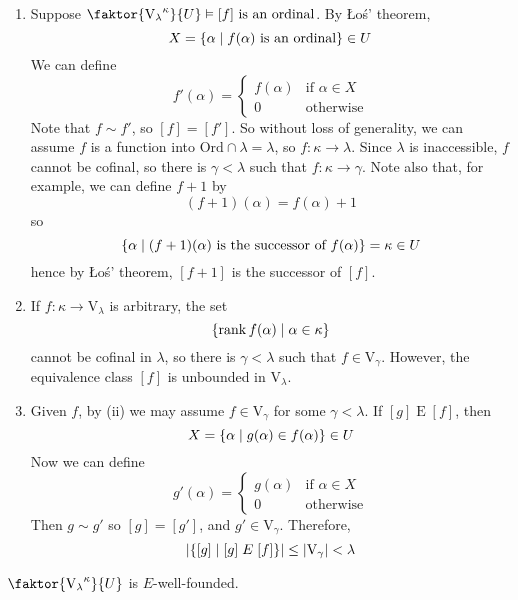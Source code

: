 \begin{remark}
    \begin{enumerate}
        \item Suppose \( \faktor{{\mathrm{V}_\lambda}^\kappa}{U} \vDash [f] \text{ is an ordinal} \).
        By \L{}o\'s' theorem,
        \[ X = \qty{\alpha \mid f(\alpha) \text{ is an ordinal}} \in U \]
        We can define
        \[ f'(\alpha) = \begin{cases}
            f(\alpha) & \text{if } \alpha \in X \\
            0 & \text{otherwise}
        \end{cases} \]
        Note that \( f \sim f' \), so \( [f] = [f'] \).
        So without loss of generality, we can assume \( f \) is a function into \( \mathrm{Ord} \cap \lambda = \lambda \), so \( f : \kappa \to \lambda \).
        Since \( \lambda \) is inaccessible, \( f \) cannot be cofinal, so there is \( \gamma < \lambda \) such that \( f : \kappa \to \gamma \).
        Note also that, for example, we can define \( f + 1 \) by
        \[ (f + 1)(\alpha) = f(\alpha) + 1 \]
        so
        \[ \qty{\alpha \mid (f+1)(\alpha) \text{ is the successor of } f(\alpha)} = \kappa \in U \]
        hence by \L{}o\'s' theorem, \( [f + 1] \) is the successor of \( [f] \).
        \item If \( f : \kappa \to \mathrm{V}_\lambda \) is arbitrary, the set
        \[ \qty{\rank f(\alpha) \mid \alpha \in \kappa} \]
        cannot be cofinal in \( \lambda \), so there is \( \gamma < \lambda \) such that \( f \in \mathrm{V}_\gamma \).
        However, the equivalence class \( [f] \) is unbounded in \( \mathrm{V}_\lambda \).
        \item Given \( f \), by (ii) we may assume \( f \in \mathrm{V}_\gamma \) for some \( \gamma < \lambda \).
        If \( [g] \mathrel{E} [f] \), then
        \[ X = \qty{\alpha \mid g(\alpha) \in f(\alpha)} \in U \]
        Now we can define
        \[ g'(\alpha) = \begin{cases}
            g(\alpha) & \text{if } \alpha \in X \\
            0 & \text{otherwise}
        \end{cases} \]
        Then \( g \sim g' \) so \( [g] = [g'] \), and \( g' \in \mathrm{V}_\gamma \).
        Therefore,
        \[ \abs{\qty{[g] \mid [g] \mathrel{E} [f]}} \leq \abs{\mathrm{V}_\gamma} < \lambda \]
    \end{enumerate}
\end{remark}
\begin{lemma}
    \( \faktor{{\mathrm{V}_\lambda}^\kappa}{U} \) is \( E \)-well-founded.
\end{lemma}
